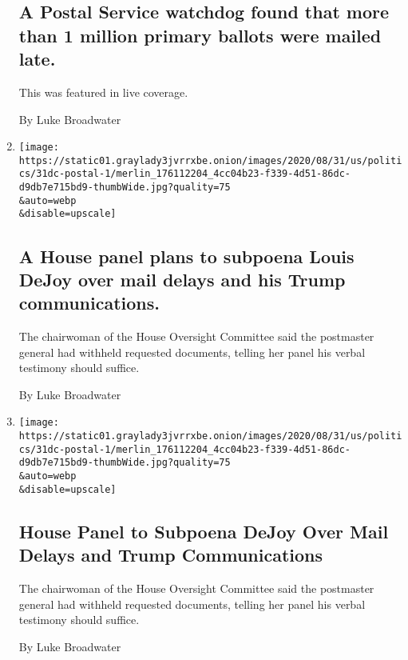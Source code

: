 \begin{enumerate}
  \hypertarget{a-postal-service-watchdog-found-that-more-than-1-million-primary-ballots-were-mailed-late}{%
  \subsection{A Postal Service watchdog found that more than 1 million
  primary ballots were mailed
  late.}\label{a-postal-service-watchdog-found-that-more-than-1-million-primary-ballots-were-mailed-late}}

  This was featured in live coverage.

  By Luke Broadwater
\item
  \href{/2020/09/01/us/elections/a-house-panel-plans-to-subpoena-louis-dejoy-over-mail-delays-and-his-trump-communications.html}{}

  \texttt{[image: https://static01.graylady3jvrrxbe.onion/images/2020/08/31/us/politics/31dc-postal-1/merlin\_176112204\_4cc04b23-f339-4d51-86dc-d9db7e715bd9-thumbWide.jpg?quality=75\\\&auto=webp\\\&disable=upscale]}

  \hypertarget{a-house-panel-plans-to-subpoena-louis-dejoy-over-mail-delays-and-his-trump-communications}{%
  \subsection{A House panel plans to subpoena Louis DeJoy over mail
  delays and his Trump
  communications.}\label{a-house-panel-plans-to-subpoena-louis-dejoy-over-mail-delays-and-his-trump-communications}}

  The chairwoman of the House Oversight Committee said the postmaster
  general had withheld requested documents, telling her panel his verbal
  testimony should suffice.

  By Luke Broadwater
\item
  \href{/2020/08/31/us/postal-service-dejoy-subpoena.html}{}

  \texttt{[image: https://static01.graylady3jvrrxbe.onion/images/2020/08/31/us/politics/31dc-postal-1/merlin\_176112204\_4cc04b23-f339-4d51-86dc-d9db7e715bd9-thumbWide.jpg?quality=75\\\&auto=webp\\\&disable=upscale]}

  \hypertarget{house-panel-to-subpoena-dejoy-over-mail-delays-and-trump-communications}{%
  \subsection{House Panel to Subpoena DeJoy Over Mail Delays and Trump
  Communications}\label{house-panel-to-subpoena-dejoy-over-mail-delays-and-trump-communications}}

  The chairwoman of the House Oversight Committee said the postmaster
  general had withheld requested documents, telling her panel his verbal
  testimony should suffice.

  By Luke Broadwater
\end{enumerate}

